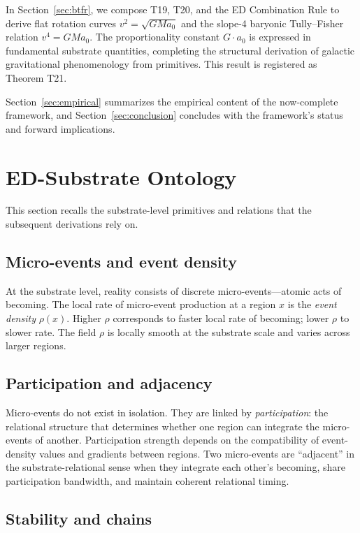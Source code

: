 \documentclass[11pt,a4paper]{article}
\begin{document}
In Section~\ref{sec:btfr}, we compose T19, T20, and the ED Combination Rule to derive flat rotation curves $v^2 = \sqrt{G M a_0}$ and the slope-4 baryonic Tully--Fisher relation $v^4 = G M a_0$. The proportionality constant $G \cdot a_0$ is expressed in fundamental substrate quantities, completing the structural derivation of galactic gravitational phenomenology from primitives. This result is registered as Theorem T21.

Section~\ref{sec:empirical} summarizes the empirical content of the now-complete framework, and Section~\ref{sec:conclusion} concludes with the framework's status and forward implications.

\section{ED-Substrate Ontology}\label{sec:ontology}

This section recalls the substrate-level primitives and relations that the subsequent derivations rely on.

\subsection{Micro-events and event density}

At the substrate level, reality consists of discrete micro-events---atomic acts of becoming. The local rate of micro-event production at a region $x$ is the \emph{event density} $\rho(x)$. Higher $\rho$ corresponds to faster local rate of becoming; lower $\rho$ to slower rate. The field $\rho$ is locally smooth at the substrate scale and varies across larger regions.

\subsection{Participation and adjacency}

Micro-events do not exist in isolation. They are linked by \emph{participation}: the relational structure that determines whether one region can integrate the micro-events of another. Participation strength depends on the compatibility of event-density values and gradients between regions. Two micro-events are ``adjacent'' in the substrate-relational sense when they integrate each other's becoming, share participation bandwidth, and maintain coherent relational timing.

\subsection{Stability and chains}
\end{document}
